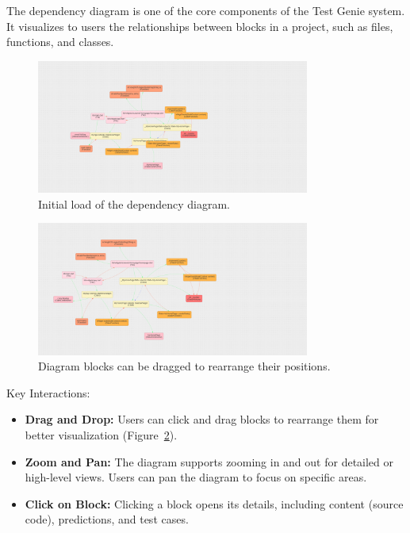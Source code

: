 The dependency diagram is one of the core components of the Test Genie system. It visualizes to users the relationships between blocks in a project, such as files, functions, and classes.

\begin{figure}[H] 
    \centering
    \includegraphics[width=0.8\textwidth]{images/diagram-initial_load.png}
    \caption{Initial load of the dependency diagram.}
    \label{fig:diagram-initial_load}
\end{figure}

\begin{figure}[H]
    \centering
    \includegraphics[width=0.8\textwidth]{images/diagram-dragged.png}
    \caption{Diagram blocks can be dragged to rearrange their positions.}
    \label{fig:diagram-dragged}
\end{figure}

Key Interactions:
\begin{itemize}
    \item \textbf{Drag and Drop:} Users can click and drag blocks to rearrange them for better visualization (Figure~\ref{fig:diagram-dragged}).
    \item \textbf{Zoom and Pan:} The diagram supports zooming in and out for detailed or high-level views. Users can pan the diagram to focus on specific areas.
    \item \textbf{Click on Block:} Clicking a block opens its details, including content (source code), predictions, and test cases.
\end{itemize}


